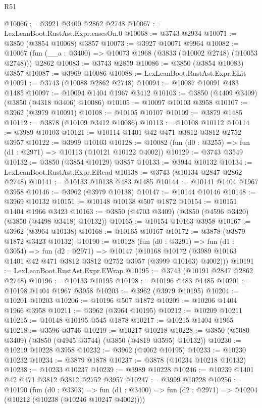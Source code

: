 \begin{lexlean}{R51}
\begin{coremodule}
@10066 := @3921 @3400 @2862 @2748
@10067 := LexLeanBoot.RustAst.Expr.casesOn.{0}
@10068 := @3743 @2934
@10071 := @3850 (@3854 @10068) @3857
@10073 := @3927 @10071 @9964
@10082 := @10067 (fun (__a : @3400) => @10073 @1968 (@3833 (@10002 @2748) (@10053 @2748))) @2862
@10083 := @3743 @2859
@10086 := @3850 (@3854 @10083) @3857
@10087 := @3969 @10086
@10088 := LexLeanBoot.RustAst.Expr.ELit
@10091 := @3743 (@10088 @2862 @2748)
@10094 := @10087 @10091 @483 @1485
@10097 := @10094 @1404 @1967 @3412
@10103 := @3850 (@4409 @3409) (@3850 (@4318 @3406) @10086)
@10105 := @10097 @10103 @3958
@10107 := @3962 (@3979 @10091)
@10108 := @10105 @10107
@10109 := @3879 @1485
@10112 := @3878 (@10109 @3412 @10086)
@10113 := @10108 @10112
@10114 := @3989 @10103
@10121 := @10114 @1401 @42 @471 @3812 @3812 @2752 @3957
@10122 := @3999 @10103
@10128 := @10082 (fun (d0 : @3255) => fun (d1 : @2971) => @10113 (@10121 @10122 @4002))
@10129 := @3743 @3549
@10132 := @3850 (@3854 @10129) @3857
@10133 := @3944 @10132
@10134 := LexLeanBoot.RustAst.Expr.ERead
@10138 := @3743 (@10134 @2847 @2862 @2748)
@10141 := @10133 @10138 @483 @1485
@10144 := @10141 @1404 @1967 @3958
@10146 := @3962 (@3979 @10138)
@10147 := @10144 @10146
@10148 := @3969 @10132
@10151 := @10148 @10138 @507 @1872
@10154 := @10151 @1404 @1966 @3423
@10163 := @3850 (@4703 @3409) (@3850 (@4596 @3420) (@3850 (@4498 @3418) @10132))
@10165 := @10154 @10163 @3958
@10167 := @3962 (@3964 @10138)
@10168 := @10165 @10167
@10172 := @3878 (@3879 @1872 @3423 @10132)
@10190 := @10128
    (fun (d0 : @3291) =>
    fun (d1 : @3054) =>
    fun (d2 : @2971) =>
    @10147
      (@10168 @10172 (@3989 @10163 @1401 @42 @471 @3812 @3812 @2752 @3957 (@3999 @10163) @4002)))
@10191 := LexLeanBoot.RustAst.Expr.EWrap
@10195 := @3743 (@10191 @2847 @2862 @2748)
@10196 := @10133 @10195
@10198 := @10196 @483 @1485
@10201 := @10198 @1404 @1967 @3958
@10203 := @3962 (@3979 @10195)
@10204 := @10201 @10203
@10206 := @10196 @507 @1872
@10209 := @10206 @1404 @1966 @3958
@10211 := @3962 (@3964 @10195)
@10212 := @10209 @10211
@10215 := @10148 @10195 @545 @1878
@10217 := @10215 @1404 @1965
@10218 := @3596 @3746
@10219 := @10217 @10218
@10228 := @3850 (@5080 @3409) (@3850 (@4945 @3744) (@3850 (@4819 @3595) @10132))
@10230 := @10219 @10228 @3958
@10232 := @3962 (@4062 @10195)
@10233 := @10230 @10232
@10234 := @3879 @1878
@10237 := @3878 (@10234 @10218 @10132)
@10238 := @10233 @10237
@10239 := @3989 @10228
@10246 := @10239 @1401 @42 @471 @3812 @3812 @2752 @3957
@10247 := @3999 @10228
@10256 := @10190
    (fun (d0 : @3303) =>
    fun (d1 : @3400) => fun (d2 : @2971) => @10204 (@10212 (@10238 (@10246 @10247 @4002))))

\end{coremodule}
\end{lexlean}

